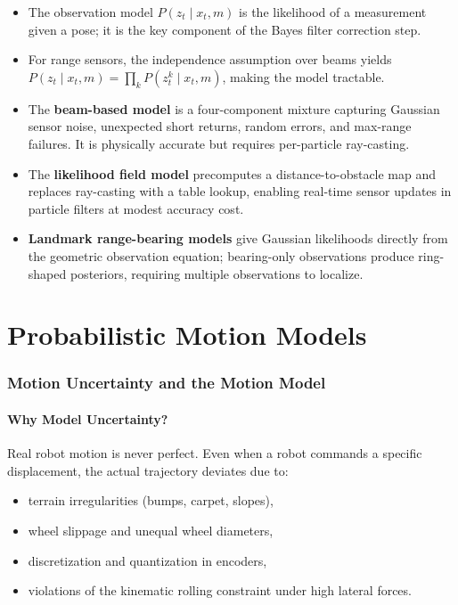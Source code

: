 \documentclass[11pt,a4paper]{article}
\theoremstyle{definition}
\theoremstyle{plain}
\theoremstyle{remark}
\begin{document}
\begin{itemize}
    \item The observation model $P(z_t \mid x_t, m)$ is the likelihood of a measurement given a pose; it is the key component of the Bayes filter correction step.
    \item For range sensors, the independence assumption over beams yields $P(z_t \mid x_t, m) = \prod_k P(z_t^k \mid x_t, m)$, making the model tractable.
    \item The \textbf{beam-based model} is a four-component mixture capturing Gaussian sensor noise, unexpected short returns, random errors, and max-range failures. It is physically accurate but requires per-particle ray-casting.
    \item The \textbf{likelihood field model} precomputes a distance-to-obstacle map and replaces ray-casting with a table lookup, enabling real-time sensor updates in particle filters at modest accuracy cost.
    \item \textbf{Landmark range-bearing models} give Gaussian likelihoods directly from the geometric observation equation; bearing-only observations produce ring-shaped posteriors, requiring multiple observations to localize.
\end{itemize}

\part{Probabilistic Motion Models}

\section{Motion Uncertainty and the Motion Model}

\subsection{Why Model Uncertainty?}

Real robot motion is never perfect. Even when a robot commands a specific displacement, the actual trajectory deviates due to:
\begin{itemize}
    \item terrain irregularities (bumps, carpet, slopes),
    \item wheel slippage and unequal wheel diameters,
    \item discretization and quantization in encoders,
    \item violations of the kinematic rolling constraint under high lateral forces.
\end{itemize}
\end{document}

